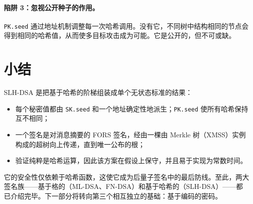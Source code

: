 \paragraph{陷阱 3：忽视公开种子的作用。}
\texttt{PK.seed} 通过地址机制调整每一次哈希调用。没有它，不同树中结构相同的节点会得到相同的哈希值，从而使多目标攻击成为可能。它是公开的，但不可或缺。

\section{小结}
SLH-DSA 是把基于哈希的阶梯组装成单个无状态标准的结果：

\begin{itemize}
  \item 每个秘密值都由 \texttt{SK.seed} 和一个地址确定性地派生；\texttt{PK.seed} 使所有哈希保持互不相同；
  \item 一个签名是对消息摘要的 FORS 签名，经由一棵由 Merkle 树（XMSS）实例构成的超树向上传递，直到唯一公布的根；
  \item 验证纯粹是哈希运算，因此该方案在假设上保守，并且易于实现为常数时间。
\end{itemize}

它的安全性仅依赖于哈希函数，这使它成为后量子签名中的最后防线。至此，两大签名族——基于格的（ML-DSA、FN-DSA）和基于哈希的（SLH-DSA）——都已介绍完毕。下一部分将转向第三个相互独立的基础：基于编码的密码。

\printbibliography[heading=chapterrefs]
